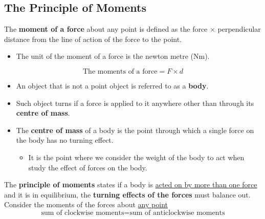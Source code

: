 \subsection{The Principle of Moments}

The \textbf{moment of a force} about any point is defined as the force $\times$ perpendicular distance from the line of action of the force to the point.
\begin{itemize}
    \item The unit of the moment of a force is the newton metre (Nm).
\end{itemize}
$$\text{The moments of a force}=F\times d$$

\begin{itemize}
    \item An object that is not a point object is referred to as a \textbf{body}.
    \item Such object turns if a force is applied to it anywhere other than through its \textbf{centre of mass}.
    \item The \textbf{centre of mass} of a body is the point through which a single force on the body has no turning effect.
        \begin{itemize}
            \item It is the point where we consider the weight of the body to act when study the effect of forces on the body.
        \end{itemize}
\end{itemize}

The \textbf{principle of moments} states if a body is \underline{acted on by more than one force} and it is in equilibrium, the \textbf{turning effects of the forces} must balance out.
Consider the moments of the forces about \underline{any point}
$$\text{sum of clockwise moments}=\text{sum of anticlockwise moments}$$
